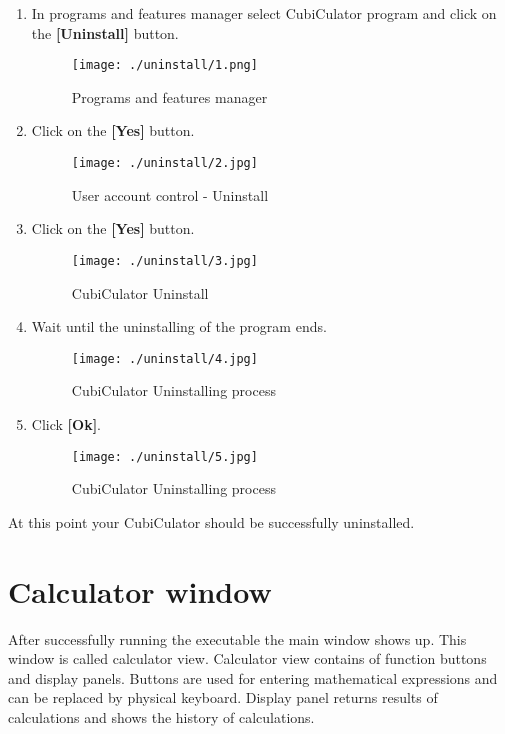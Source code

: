 \documentclass{article}
\begin{document}
\begin{enumerate}
\item In programs and features manager select CubiCulator program and click on the \textbf{[Uninstall]} button.
  \begin{figure}[H]
    \centering
    \texttt{[image: ./uninstall/1.png]}
    \caption{Programs and features manager}
  \end{figure}
  
  
\item Click on the \textbf{[Yes]} button.
  \begin{figure}[H]
    \centering
    \texttt{[image: ./uninstall/2.jpg]}
    \caption{User account control - Uninstall}
  \end{figure}
  
\item Click on the \textbf{[Yes]} button.
  \begin{figure}[H]
    \centering
    \texttt{[image: ./uninstall/3.jpg]}
    \caption{CubiCulator Uninstall}
  \end{figure}

\item Wait until the uninstalling of the program ends.
  \begin{figure}[H]
    \centering
    \texttt{[image: ./uninstall/4.jpg]}
    \caption{CubiCulator Uninstalling process}
  \end{figure}


\item Click \textbf{[Ok]}.
  \begin{figure}[H]
    \centering
    \texttt{[image: ./uninstall/5.jpg]}
    \caption{CubiCulator Uninstalling process}
  \end{figure}

\end{enumerate}
At this point your CubiCulator should be successfully uninstalled.

\newpage
\section{Calculator window}
After successfully running the executable the main window shows up. This window is called calculator view. Calculator view contains of function buttons and display panels. Buttons are used for entering mathematical expressions and can be replaced by physical keyboard. Display panel returns results of calculations and shows the history of calculations.
\end{document}
